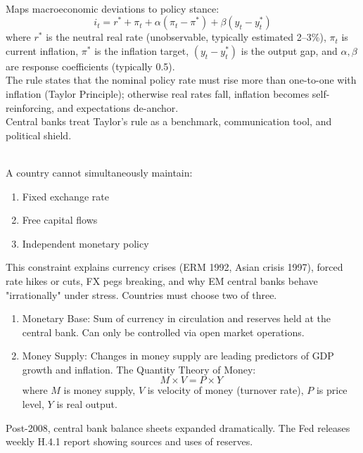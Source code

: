 \documentclass[a4paper,oneside,openany]{book}
\begin{document}
\begin{remark} \\
Maps macroeconomic deviations to policy stance:
\begin{equation*}
i_t = r^* + \pi_t + \alpha (\pi_t - \pi^*) + \beta (y_t - y_t^*)
\end{equation*}
where $r^*$ is the neutral real rate (unobservable, typically estimated 2--3\%), $\pi_t$ is current inflation, $\pi^*$ is the inflation target, $(y_t - y_t^*)$ is the output gap, and $\alpha, \beta$ are response coefficients (typically 0.5).\\
The rule states that the nominal policy rate must rise more than one-to-one with inflation (Taylor Principle); otherwise real rates fall, inflation becomes self-reinforcing, and expectations de-anchor.\\
Central banks treat Taylor's rule as a benchmark, communication tool, and political shield.
\end{remark}

\begin{remark} \\
A country cannot simultaneously maintain:
\begin{enumerate}[label=\roman*.]
\setlength{\itemsep}{0pt}
\item Fixed exchange rate
\item Free capital flows
\item Independent monetary policy
\end{enumerate}
This constraint explains currency crises (ERM 1992, Asian crisis 1997), forced rate hikes or cuts, FX pegs breaking, and why EM central banks behave "irrationally" under stress. Countries must choose two of three.
\end{remark}

\begin{remark} 
\begin{enumerate}[label=\roman*.]
\setlength{\itemsep}{0pt}
\item Monetary Base: Sum of currency in circulation and reserves held at the central bank. Can only be controlled via open market operations.
\item Money Supply: Changes in money supply are leading predictors of GDP growth and inflation. The Quantity Theory of Money:
\begin{equation*}
M \times V = P \times Y
\end{equation*}
where $M$ is money supply, $V$ is velocity of money (turnover rate), $P$ is price level, $Y$ is real output.
\end{enumerate}
Post-2008, central bank balance sheets expanded dramatically. The Fed releases weekly H.4.1 report showing sources and uses of reserves.
\end{remark}
\end{document}
